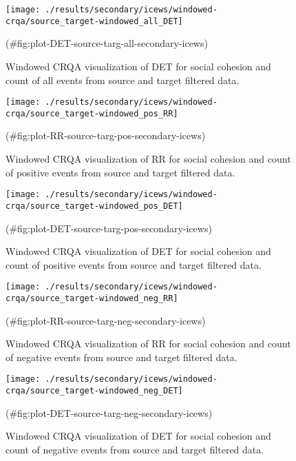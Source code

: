 \begin{appendix}
\begin{figure}[H]
\texttt{[image: ./results/secondary/icews/windowed-crqa/source\_target-windowed\_all\_DET]} \caption{Windowed CRQA visualization of DET for social cohesion and count of all events from source and target filtered data.}(\#fig:plot-DET-source-targ-all-secondary-icews)
\end{figure}
\begin{figure}[H]
\texttt{[image: ./results/secondary/icews/windowed-crqa/source\_target-windowed\_pos\_RR]} \caption{Windowed CRQA visualization of RR for social cohesion and count of positive events from source and target filtered data.}(\#fig:plot-RR-source-targ-pos-secondary-icews)
\end{figure}
\begin{figure}[H]
\texttt{[image: ./results/secondary/icews/windowed-crqa/source\_target-windowed\_pos\_DET]} \caption{Windowed CRQA visualization of DET for social cohesion and count of positive events from source and target filtered data.}(\#fig:plot-DET-source-targ-pos-secondary-icews)
\end{figure}
\begin{figure}[H]
\texttt{[image: ./results/secondary/icews/windowed-crqa/source\_target-windowed\_neg\_RR]} \caption{Windowed CRQA visualization of RR for social cohesion and count of negative events from source and target filtered data.}(\#fig:plot-RR-source-targ-neg-secondary-icews)
\end{figure}
\begin{figure}[H]
\texttt{[image: ./results/secondary/icews/windowed-crqa/source\_target-windowed\_neg\_DET]} \caption{Windowed CRQA visualization of DET for social cohesion and count of negative events from source and target filtered data.}(\#fig:plot-DET-source-targ-neg-secondary-icews)
\end{figure}
\end{appendix}

